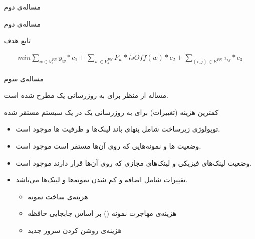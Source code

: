 \documentclass{beamer}
\makeatletter
\newcommand{\RTList}{\raggedleft\rightskip\@totalleftmargin}
\makeatother
\begin{document}
\begin{persian}
\begin{frame}{مساله‌ی دوم}
\end{frame}
\begin{frame}{مساله‌ی دوم}
	\par
	تابع هدف
	\begin{latin}\begin{align}
		min \sum_{w \in V_{s}^{PN}} y_w * c_1 + \sum_{w \in V_{s}^{PN}} P_w * isOff(w) * c_2 + \sum_{(i,j) \in E^{PN}} \tau_{ij} * c_3
	\end{align}\end{latin}
\end{frame}
\begin{frame}{مساله‌ی سوم}
	\par
	مساله از منظر  برای به روزرسانی یک 
	مطرح شده است.
\end{frame}
\begin{frame}
	\par
	کمترین هزینه (تغییرات) برای به روزرسانی یک 
	در یک سیستم مستقر شده
\end{frame}
\begin{frame}
	\begin{itemize}\RTList
		\item توپولوژی زیرساخت شامل پنهای باند لینک‌ها و ظرفیت ها موجود است.
		\item وضعیت ها و نمونه‌هایی که روی آن‌ها مستقر است موجود است.
		\item وضعیت لینک‌های فیزیکی و لینک‌های مجازی که روی آن‌ها قرار دارند موجود است.
		\item تغییرات شامل اضافه و کم شدن نمونه‌ها و لینک‌ها می‌باشد.
		\begin{itemize}\RTList
			\item هزینه‌ی ساخت نمونه
			\item هزینه‌ی مهاجرت نمونه () بر اساس جابجایی حافظه
			\item هزینه‌ی روشن کردن سرور جدید
		\end{itemize}
	\end{itemize}
\end{frame}
\end{persian}
\end{document}
